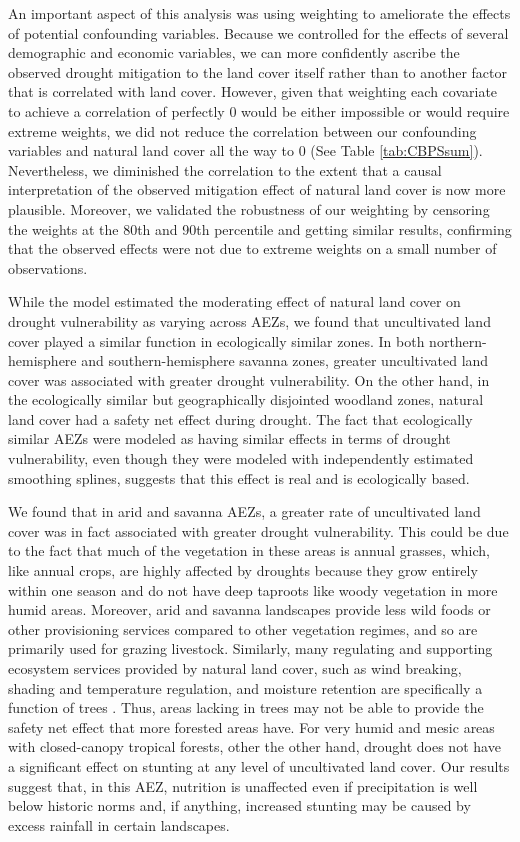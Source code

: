 \documentclass[titlepage]{article}
\begin{document}
An important aspect of this analysis was using weighting to ameliorate the effects of potential confounding variables.  Because we controlled for the effects of several demographic and economic variables, we can more confidently ascribe the observed drought mitigation to the land cover itself rather than to another factor that is correlated with land cover.  However, given that weighting each covariate to achieve a correlation of perfectly 0 would be either impossible or would require extreme weights, we did not reduce the correlation between our confounding variables and natural land cover all the way to 0 (See Table \ref{tab:CBPSsum}).  Nevertheless, we diminished the correlation to the extent that a causal interpretation of the observed mitigation effect of natural land cover is now more plausible. Moreover, we validated the robustness of our weighting by censoring the weights at the 80th and 90th percentile and getting similar results, confirming that the observed effects were not due to extreme weights on a small number of observations.

While the model estimated the moderating effect of natural land cover on drought vulnerability as varying across AEZs, we found that uncultivated land cover played a similar function in ecologically similar zones.  In both northern-hemisphere and southern-hemisphere savanna zones, greater uncultivated land cover was associated with greater drought vulnerability.  On the other hand, in the ecologically similar but geographically disjointed woodland zones, natural land cover had a safety net effect during drought.  The fact that ecologically similar AEZs were modeled as having similar effects in terms of drought vulnerability, even though they were modeled with independently estimated smoothing splines, suggests that this effect is real and is ecologically based.

We found that in arid and savanna AEZs, a greater rate of uncultivated land cover was in fact associated with greater drought vulnerability.  This could be due to the fact that much of the vegetation in these areas is annual grasses, which, like annual crops, are highly affected by droughts because they grow entirely within one season and do not have deep taproots like woody vegetation in more humid areas.  Moreover, arid and savanna landscapes provide less wild foods or other provisioning services compared to other vegetation regimes, and so are primarily used for grazing livestock.  Similarly, many regulating and supporting ecosystem services provided by natural land cover, such as wind breaking, shading and temperature regulation, and moisture retention are specifically a function of trees \citep{Reed2016}.  Thus, areas lacking in trees may not be able to provide the safety net effect that more forested areas have.  For very humid and mesic areas with closed-canopy tropical forests, other the other hand, drought does not have a significant effect on stunting at any level of uncultivated land cover.  Our results suggest that, in this AEZ, nutrition is unaffected even if precipitation is well below historic norms and, if anything, increased stunting may be caused by excess rainfall in certain landscapes.
\end{document}
